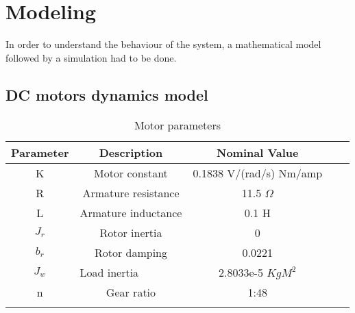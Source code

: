 \chapter{Modeling}\label{ch:modeling}


In order to understand the behaviour of the system, a mathematical model followed by a simulation had to be done. 

\section{DC motors dynamics model} \label{dc_math}

\begin{table}[h]
\centering
\begin{tabular}{cccll}
\hline
Parameter                   & Description                               & Nominal Value                                 &  &  \\ \hline
\multicolumn{1}{|c|}{K}     & \multicolumn{1}{c|}{Motor constant}       & \multicolumn{1}{c|}{0.1838 V/(rad/s)  Nm/amp} &  &  \\ \cline{1-3}
\multicolumn{1}{|c|}{R}     & \multicolumn{1}{c|}{Armature resistance}  & \multicolumn{1}{c|}{11.5 $\Omega$}            &  &  \\ \cline{1-3}
\multicolumn{1}{|c|}{L}     & \multicolumn{1}{c|}{Armature inductance}  & \multicolumn{1}{c|}{0.1 H}                    &  &  \\ \cline{1-3}
\multicolumn{1}{|c|}{$J_r$} & \multicolumn{1}{c|}{Rotor inertia}       & \multicolumn{1}{c|}{0}                        &  &  \\ \cline{1-3}
\multicolumn{1}{|c|}{$b_r$} & \multicolumn{1}{c|}{Rotor damping}        & \multicolumn{1}{c|}{0.0221}                   &  &  \\ \cline{1-3}
\multicolumn{1}{|c|}{$J_w$} & \multicolumn{1}{l|}{Load inertia} & \multicolumn{1}{c|}{2.8033e-5 $KgM^2$}        &  &  \\ \cline{1-3}
\multicolumn{1}{|c|}{n}     & \multicolumn{1}{c|}{Gear ratio}           & \multicolumn{1}{c|}{1:48}                     &  &  \\ \cline{1-3}
\multicolumn{1}{l}{}        & \multicolumn{1}{l}{}                      & \multicolumn{1}{l}{}                          &  &  \\ \hline
\end{tabular}
\caption{Motor parameters}
\label{my-label}
\end{table}


